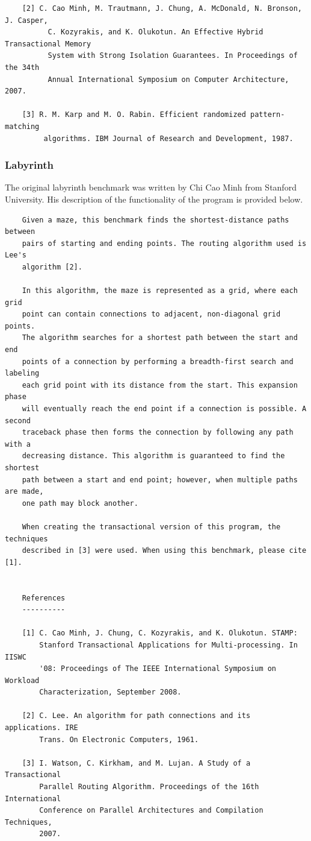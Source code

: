 \documentclass{article}
\begin{document}
\begin{verbatim}
    [2] C. Cao Minh, M. Trautmann, J. Chung, A. McDonald, N. Bronson, J. Casper,
          C. Kozyrakis, and K. Olukotun. An Effective Hybrid Transactional Memory
          System with Strong Isolation Guarantees. In Proceedings of the 34th 
          Annual International Symposium on Computer Architecture, 2007.

    [3] R. M. Karp and M. O. Rabin. Efficient randomized pattern-matching
         algorithms. IBM Journal of Research and Development, 1987.

\end{verbatim}

\subsubsection{Labyrinth}

The original labyrinth benchmark was written by Chi Cao Minh from Stanford 
University. His description of the functionality of the program is provided 
below.

\begin{verbatim}
    Given a maze, this benchmark finds the shortest-distance paths between
    pairs of starting and ending points. The routing algorithm used is Lee's 
    algorithm [2].
 
    In this algorithm, the maze is represented as a grid, where each grid 
    point can contain connections to adjacent, non-diagonal grid points. 
    The algorithm searches for a shortest path between the start and end 
    points of a connection by performing a breadth-first search and labeling 
    each grid point with its distance from the start. This expansion phase 
    will eventually reach the end point if a connection is possible. A second 
    traceback phase then forms the connection by following any path with a 
    decreasing distance. This algorithm is guaranteed to find the shortest 
    path between a start and end point; however, when multiple paths are made, 
    one path may block another.

    When creating the transactional version of this program, the techniques
    described in [3] were used. When using this benchmark, please cite [1].


    References
    ----------

    [1] C. Cao Minh, J. Chung, C. Kozyrakis, and K. Olukotun. STAMP: 
        Stanford Transactional Applications for Multi-processing. In IISWC
        '08: Proceedings of The IEEE International Symposium on Workload 
        Characterization, September 2008. 

    [2] C. Lee. An algorithm for path connections and its applications. IRE 
        Trans. On Electronic Computers, 1961.

    [3] I. Watson, C. Kirkham, and M. Lujan. A Study of a Transactional 
        Parallel Routing Algorithm. Proceedings of the 16th International 
        Conference on Parallel Architectures and Compilation Techniques, 
        2007.
\end{verbatim}
\end{document}
